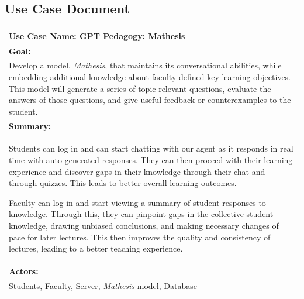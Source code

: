 \documentclass[12pt,a4paper]{article}
\begin{document}
    \begin{appendices}

        \setcounter{section}{0}
        \section{Use Case Document}

        \begin{table}[H]
        \label{tab:useCaseDoc1}
        \centering
        \def\arraystretch{1.4}
        \begin{tabular}{|p{13cm}|}
            \hline
            \textbf{Use Case Name:} GPT Pedagogy: Mathesis\\\hline

            \textbf{Goal:}\\

            Develop a model, \textit{Mathesis}, that maintains its conversational abilities,
            while embedding additional knowledge about faculty defined key learning objectives.
            This model will generate a series of topic-relevant questions, evaluate the answers of
            those questions, and give useful feedback or counterexamples to the student.\\\hline

            \textbf{Summary:}\\

            Students can log in and can start chatting with our agent as it
            responds in real time with auto-generated responses. They can then proceed with their
            learning experience and discover gaps in their knowledge through their chat and through
            quizzes.  This leads to better overall learning outcomes.

            Faculty can log in and start viewing a summary of student responses to knowledge.
            Through this, they can pinpoint gaps in the collective student knowledge, drawing
            unbiased conclusions, and making necessary changes of pace for later lectures.  This then
            improves the quality and consistency of lectures, leading to a better teaching experience.
            \\\hline

            \textbf{Actors:}\\

            Students, Faculty, Server, \textit{Mathesis} model, Database\\\hline


\end{tabular}
\end{table}
\end{appendices}
\end{document}
